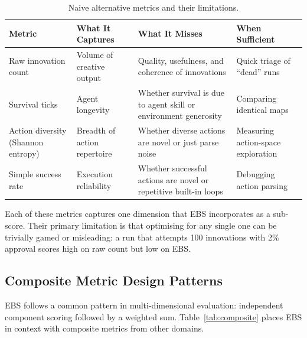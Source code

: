 \documentclass[a4paper, 11pt]{article}
\begin{document}
\begin{table}[ht]
\centering
\caption{Naive alternative metrics and their limitations.}
\label{tab:naive}
\small
\begin{tabular}{@{}p{3cm}p{4cm}p{4cm}p{3cm}@{}}
\toprule
\textbf{Metric} & \textbf{What It Captures} & \textbf{What It Misses} & \textbf{When Sufficient} \\
\midrule
Raw innovation count & Volume of creative output & Quality, usefulness, and coherence of innovations & Quick triage of ``dead'' runs \\
\addlinespace
Survival ticks & Agent longevity & Whether survival is due to agent skill or environment generosity & Comparing identical maps \\
\addlinespace
Action diversity (Shannon entropy) & Breadth of action repertoire & Whether diverse actions are novel or just parse noise & Measuring action-space exploration \\
\addlinespace
Simple success rate & Execution reliability & Whether successful actions are novel or repetitive built-in loops & Debugging action parsing \\
\bottomrule
\end{tabular}
\end{table}

Each of these metrics captures one dimension that EBS incorporates as a sub-score. Their primary limitation is that optimising for any single one can be trivially gamed or misleading: a run that attempts 100 innovations with 2\% approval scores high on raw count but low on EBS.

\subsection{Composite Metric Design Patterns}

EBS follows a common pattern in multi-dimensional evaluation: independent component scoring followed by a weighted sum. Table~\ref{tab:composite} places EBS in context with composite metrics from other domains.
\end{document}
